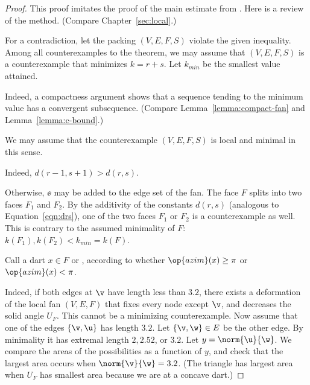 \begin{proof} This proof imitates the proof of the main estimate from
  \cite{Hales:2006:DCG}.  Here is a review of the method.  (Compare Chapter~\ref{sec:local}.)

  For a contradiction, let the packing $(V,E,F,S)$  violate the given inequality.
  Among all counterexamples to the theorem, we may assume that $(V,E,F,S)$ is a counterexample that
  minimizes $k=r+s$.  Let $k_{min}$ be the smallest value attained.



  Indeed,
a compactness argument shows that a sequence tending to the minimum value has a convergent
subsequence.  (Compare Lemma~\ref{lemma:compact-fan} and Lemma~\ref{lemma:c-bound}.) 

We may assume that the counterexample $(V,E,F,S)$ is local and minimal in this sense.

  Indeed,
$d(r-1,s+1)>d(r,s)$.

  Otherwise, $\ee$
  may be added to the edge set of the
  fan.    The face $F$ splits into two faces $F_1$ and $F_2$.
  By  the additivity of the constants $d(r,s)$ (analogous to
  Equation~\ref{eqn:drs}), one of the two faces $F_1$ or $F_2$ is a counterexample as well.
  This is contrary to the assumed minimality of $F$: $k(F_1),k(F_2)<k_{min}=k(F)$.  


  Call a dart $x\in F$  or , according to whether
  $\op{azim}(x)\ge\pi$ or $\op{azim}(x)<\pi$.  
%
%

  Indeed, if both edges at $\v$ have length less than $3.2$,
there exists a deformation of the local fan $(V,E,F)$ that fixes every node except $\v$, and
decreases the solid angle $U_F$.  This cannot be a minimizing counterexample.  Now assume that
one of the edges $\{\v,\u\}$ has length $3.2$.  Let $\{\v,\w\}\in E$ be the other edge.  By minimality
it has extremal length $2,2.52$, or $3.2$.  Let $y=\norm{\u}{\w}$.  We compare the areas of the possibilities
as a function of $y$, and check that the largest area occurs when $\norm{\v}{\w}=3.2$.  (The triangle has largest area when $U_F$ has smallest area because we are at a concave dart.)


\end{proof}
